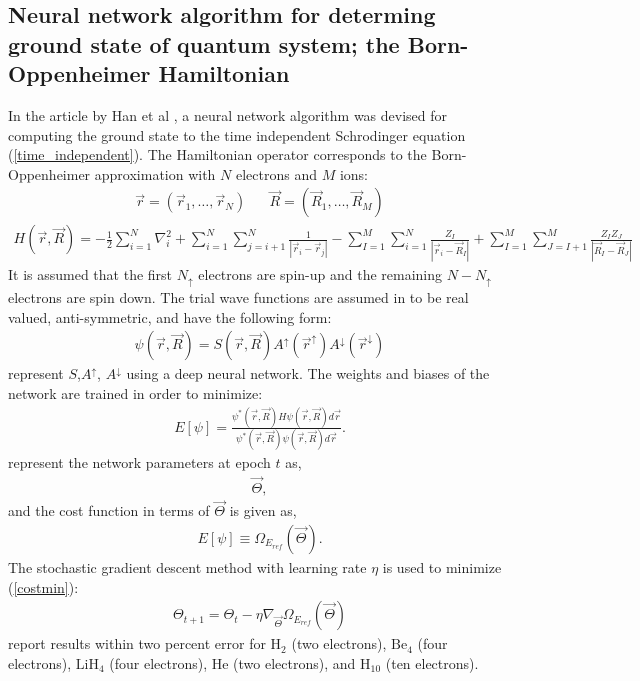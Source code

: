 \documentclass[a4paper,fleqn]{cas-sc}
\begin{document}
\subsection{Neural network algorithm for determing ground state
of quantum system; the Born-Oppenheimer Hamiltonian}

In the article by Han et al \cite{HAN2019108929}, a neural network 
algorithm was devised for computing the ground state to the 
time independent Schrodinger equation (\ref{time_independent}).
The Hamiltonian operator corresponds to the Born-Oppenheimer 
approximation \cite{https://doi.org/10.1002/andp.19273892002}
with $N$ electrons and $M$ ions:
\begin{eqnarray}
\vec{r}=(\vec{r}_{1},\ldots,\vec{r}_{N}) \hspace{20pt}
\vec{R}=(\vec{R}_{1},\ldots,\vec{R}_{M})
\end{eqnarray}
\begin{eqnarray}
H(\vec{r},\vec{R})=
-\frac{1}{2}\sum_{i=1}^{N}\nabla_{i}^{2}+
\sum_{i=1}^{N}\sum_{j=i+1}^{N}\frac{1}{|\vec{r}_{i}-\vec{r}_{j}|}-
\sum_{I=1}^{M}\sum_{i=1}^{N}\frac{Z_{I}}{|\vec{r}_{i}-\vec{R}_{I}|}+
\sum_{I=1}^{M}\sum_{J=I+1}^{M}\frac{Z_{I}Z_{J}}{|\vec{R}_{I}-\vec{R}_{J}|}
\end{eqnarray}
It is assumed that the first $N_{\uparrow}$ electrons are spin-up and the remaining $N-N_{\uparrow}$ electrons are spin down\cite{foulkes2001quantum}.
The trial wave functions are assumed in \cite{HAN2019108929} to be real valued, anti-symmetric, and have the following form:
\begin{eqnarray}
\psi(\vec{r},\vec{R})=S(\vec{r},\vec{R})
 A^{\uparrow}(\vec{r}^{\uparrow})A^{\downarrow}(\vec{r}^{\downarrow})
\end{eqnarray}
\cite{HAN2019108929} represent $S$,$A^{\uparrow}$, $A^{\downarrow}$ using
a deep neural network.  The weights and biases of the network are trained in order to minimize:
\begin{eqnarray}
E[\psi]=\frac{\psi^{\ast}(\vec{r},\vec{R})H\psi(\vec{r},\vec{R})d\vec{r}}
    {\psi^{\ast}(\vec{r},\vec{R})\psi(\vec{r},\vec{R})d\vec{r}}.
\end{eqnarray}
\cite{HAN2019108929} represent the network parameters at epoch $t$ as,
\begin{eqnarray}
\vec{\Theta},
\end{eqnarray}
and the cost function in terms of $\vec{\Theta}$ is given as,
\begin{eqnarray}
E[\psi]\equiv \Omega_{E_{ref}}(\vec{\Theta}). \label{costmin}
\end{eqnarray}
The stochastic gradient descent method with learning
rate $\eta$ is used to minimize (\ref{costmin}):
\begin{eqnarray}
\Theta_{t+1}=\Theta_{t}-\eta\nabla_{\vec{\Theta}} \Omega_{E_{ref}}(\vec{\Theta})
\end{eqnarray}
\cite{HAN2019108929} report results within two percent error for 
$\mbox{H}_{2}$ (two electrons), 
$\mbox{Be}_{4}$ (four electrons), 
$\mbox{LiH}_{4}$ (four electrons), 
$\mbox{He}$ (two electrons), and
$\mbox{H}_{10}$ (ten electrons).
\end{document}
